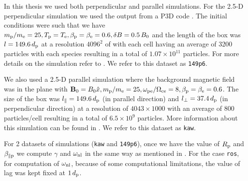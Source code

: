         In this thesis we used both perpendicular and parallel simulations. For the 2.5-D
        perpendicular simulation we used the output from a P3D code \citep{Zeiler2002}. The initial
        conditions were such that we have $m_{\rm p}/m_{\rm e} = 25, T_{\rm p} = T_{\rm e},
        \beta_{\rm p} = \beta_{\rm e} = 0.6, \delta B = 0.5\,B_{\rm 0}$ and the length of the box
        was $l = 149.6\,d_{\rm p}$ at a resolution $4096^2$ of with each cell having an average of
        3200 particles with each species resulting in a total of $1.07 \times 10^{11}$ particles.
        For more details on the simulation refer to \citep{Parashar2018}. We refer to this dataset
        as \texttt{149p6}.

        We also used a 2.5-D parallel simulation where the background magnetic field was in the
        plane with $\mathbf{B}_{\rm 0} = B_{\rm 0} \hat{x}, m_{\rm p}/m_{\rm e} = 25, \omega_{\rm
        pe}/\Omega_{\rm ce} = 8, \beta_{\rm p}= \beta_{\rm e} = 0.6$. The size of the box was
        $l_\parallel = 149.6\,d_{\rm p}$ (in parallel direction) and $l_\perp = 37.4\,d_{\rm p}$ (in
        perpendicular direction) at a resolution of $4043 \times 1000$ with an average of 800
        particles/cell resulting in a total of $6.5 \times 10^{9}$ particles.  More information
        about this simulation can be found in \citep{Parashar2019, Gary2020}. We refer to this
        dataset as \texttt{kaw}.

        For 2 datasets of simulations (\texttt{kaw} and \texttt{149p6}), once we have the value of
        $R_{\rm p}$ and $\beta_{\parallel \rm p}$ we compute $\gamma$ and $\omega_{\rm nl}$ in the
        same way as mentioned in . For the case \texttt{ros}, for computation of
        $\omega_{\rm nl}$, because of some computational limitations, the value of lag was kept
        fixed at $1\,d_{\rm p}$.

